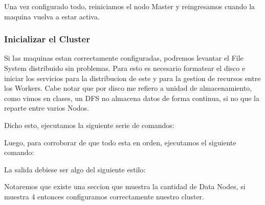 \documentclass[9pt,letterpaper,twoside]{article}
\begin{document}
\newpage

\begin{code}[H]
    
\end{code}

Una vez configurado todo, reiniciamos el nodo Master y reingresamos cuando la maquina vuelva a estar activa.

\newpage

\subsubsection*{Inicializar el Cluster}

\noindent
Si las maquinas estan correctamente configuradas, podremos levantar el File System distribuido sin problemas.
Para esto es necesario formatear el disco e iniciar los servicios para la distribucion de este y para la gestion
de recursos entre los Workers. Cabe notar que por disco me refiero a unidad de almacenamiento, como vimos en
clases, un DFS no almacena datos de forma continua, si no que la reparte entre varios Nodos.

\noindent
Dicho esto, ejecutamos la siguiente serie de comandos:

\begin{code}[H]
    
\end{code}

\noindent
Luego, para corroborar de que todo esta en orden, ejecutamos el siguiente comando:

\begin{code}[H]
    
\end{code}

\noindent
La salida debiese ser algo del siguiente estilo:

\begin{code}[H]
    
\end{code}

Notaremos que existe una seccion que muestra la cantidad de Data Nodes, si muestra 4 entonces configuramos correctamente
nuestro cluster.
\end{document}
